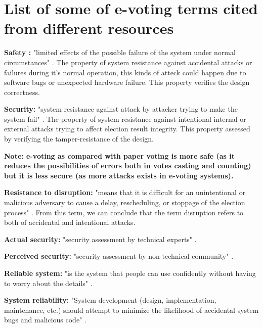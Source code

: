 \section{List of some of e-voting terms cited from different resources}


\textbf{Safety :} "limited effects of the possible failure of the system under normal circumstances" \cite{S1}. The property of system resistance against accidental attacks or failures during it's normal operation, this kinds of atteck could happen due to software bugs or unexpected hardware failure. This property verifies the design correctness.



\textbf{Security:} "system resistance against attack by attacker trying to make the system fail" \cite{S1}. The property of system resistance against intentional internal or external attacks trying to affect election result integrity. This property assessed by verifying the tamper-resistance of the design.



\textbf{Note: e-voting as compared with paper voting is more safe (as it reduces the possibilities of errors both in votes casting and counting) but it is less secure (as more attacks exists in e-voting systems). }



\textbf{Resistance to disruption:} "means that it is difficult for an unintentional or malicious adversary to cause a delay, rescheduling, or stoppage of the election process" \cite{S3}. From this term, we can conclude that the term disruption refers to both of accidental and intentional attacks.



\textbf{Actual security:} "security assessment  by technical experts" \cite{S1}.  



\textbf{Perceived security:} "security assessment by non-technical community" \cite{S1}.




\textbf{Reliable system:} "is the system that people can use confidently without having to worry about the details" \cite{S1}. 




\textbf{System reliability:} "System development (design, implementation, maintenance, etc.) should attempt to minimize the likelihood of accidental system bugs and malicious code" \cite{S4}.




